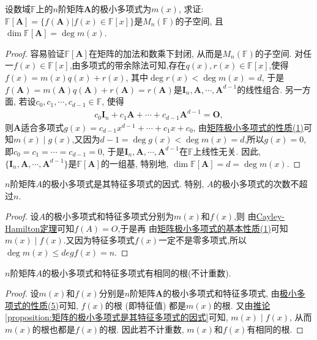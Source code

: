 \documentclass[../../main.tex]{subfiles}
\begin{document}
\begin{proposition}\label{proposition:F[A]的维数等于A的极小多项式的次数}
设数域\(\mathbb{F}\)上的\(n\)阶矩阵\(\boldsymbol{A}\)的极小多项式为\(m(x)\), 求证: \(\mathbb{F}[\boldsymbol{A}] = \{f(\boldsymbol{A})|f(x)\in\mathbb{F}[x]\}\)是\(M_n(\mathbb{F})\)的子空间, 且\(\dim\mathbb{F}[\boldsymbol{A}] = \deg m(x)\).
\end{proposition}
\begin{proof}
容易验证\(\mathbb{F}[\boldsymbol{A}]\)在矩阵的加法和数乘下封闭, 从而是\(M_n(\mathbb{F})\)的子空间. 对任一\(f(x)\in\mathbb{F}[x]\),由多项式的带余除法可知,存在$q(x),r(x)\in \mathbb{F}[x]$,使得\(f(x) = m(x)q(x) + r(x)\), 其中\(\deg r(x)<\deg m(x) = d\), 于是\(f(\boldsymbol{A}) = m(\boldsymbol{A})q(\boldsymbol{A}) + r(\boldsymbol{A}) = r(\boldsymbol{A})\)是\(\boldsymbol{I}_n,\boldsymbol{A},\cdots,\boldsymbol{A}^{d - 1}\)的线性组合. 另一方面, 若设\(c_0,c_1,\cdots,c_{d - 1}\in\mathbb{F}\), 使得
\begin{align*}
c_0\boldsymbol{I}_n + c_1\boldsymbol{A}+\cdots + c_{d - 1}\boldsymbol{A}^{d - 1} = \boldsymbol{O},
\end{align*}
则\(\boldsymbol{A}\)适合多项式\(g(x) = c_{d - 1}x^{d - 1}+\cdots + c_1x + c_0\), 由\hyperref[proposition:极小多项式的性质]{矩阵极小多项式的性质(1)}可知$m(x)\mid g(x)$,又因为\(d-1=\deg g(x)<\deg m(x) = d\),所以\(g(x) = 0\), 即\(c_0 = c_1 = \cdots = c_{d - 1} = 0\), 于是\(\boldsymbol{I}_n,\boldsymbol{A},\cdots,\boldsymbol{A}^{d - 1}\)在\(\mathbb{F}\)上线性无关. 因此, \(\{\boldsymbol{I}_n,\boldsymbol{A},\cdots,\boldsymbol{A}^{d - 1}\}\)是\(\mathbb{F}[\boldsymbol{A}]\)的一组基, 特别地, \(\dim\mathbb{F}[\boldsymbol{A}] = d = \deg m(x)\). 
\end{proof}

\begin{proposition}\label{proposition:矩阵的极小多项式是其特征多项式的因式}
$n$阶矩阵$A$的极小多项式是其特征多项式的因式. 特别, $A$的极小多项式的次数不超过$n$.
\end{proposition}
\begin{proof}
设$A$的极小多项式和特征多项式分别为$m(x)$和$f(x)$,则
由\hyperref[theorem:Cayley-Hamilton定理]{Cayley-Hamilton定理}可知$f(A)=O$,于是再
由\hyperref[proposition:极小多项式的性质]{矩阵极小多项式的基本性质(1)}可知$m(x)\mid f(x)$.又因为特征多项式$f(x)$一定不是零多项式,所以$\deg m(x)\leqslant  deg f(x)=n$.
\end{proof}

\begin{corollary}\label{corollary:极小多项式和特征多项式有相同的根(不计重数)}
$n$阶矩阵$A$的极小多项式和特征多项式有相同的根(不计重数).
\end{corollary}
\begin{proof}
设\(m(x)\)和\(f(x)\)分别是\(n\)阶矩阵\(\boldsymbol{A}\)的极小多项式和特征多项式,
由\hyperref[proposition:极小多项式的性质]{极小多项式的性质(5)}可知, \(f(x)\)的根 (即特征值) 都是\(m(x)\)的根. 又由\hyperref[proposition:矩阵的极小多项式是其特征多项式的因式]{推论\ref{proposition:矩阵的极小多项式是其特征多项式的因式}}可知, \(m(x)\mid f(x)\), 从而\(m(x)\)的根也都是\(f(x)\)的根. 因此若不计重数, \(m(x)\)和\(f(x)\)有相同的根. 
\end{proof}
\end{document}
